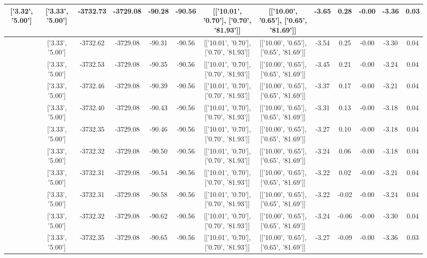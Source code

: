 \begin{table}[htbp]
\begin{adjustbox}{angle=90}
\begin{tabular}{|c|c|c|c|c|c|c|c|c|c|c|c|c|}
 ['3.32', '5.00'] & ['3.33', '5.00'] & -3732.73 & -3729.08 & -90.28 & -90.56 & [['10.01', '0.70'], ['0.70', '81.93']] & [['10.00', '0.65'], ['0.65', '81.69']] & -3.65 & 0.28 & -0.00 & -3.36 & 0.03\\ \hline
 ['3.32', '5.00'] & ['3.33', '5.00'] & -3732.62 & -3729.08 & -90.31 & -90.56 & [['10.01', '0.70'], ['0.70', '81.93']] & [['10.00', '0.65'], ['0.65', '81.69']] & -3.54 & 0.25 & -0.00 & -3.30 & 0.04\\ \hline
 ['3.32', '5.00'] & ['3.33', '5.00'] & -3732.53 & -3729.08 & -90.35 & -90.56 & [['10.01', '0.70'], ['0.70', '81.93']] & [['10.00', '0.65'], ['0.65', '81.69']] & -3.45 & 0.21 & -0.00 & -3.24 & 0.04\\ \hline
 ['3.33', '5.00'] & ['3.33', '5.00'] & -3732.46 & -3729.08 & -90.39 & -90.56 & [['10.01', '0.70'], ['0.70', '81.93']] & [['10.00', '0.65'], ['0.65', '81.69']] & -3.37 & 0.17 & -0.00 & -3.21 & 0.04\\ \hline
 ['3.33', '5.00'] & ['3.33', '5.00'] & -3732.40 & -3729.08 & -90.43 & -90.56 & [['10.01', '0.70'], ['0.70', '81.93']] & [['10.00', '0.65'], ['0.65', '81.69']] & -3.31 & 0.13 & -0.00 & -3.18 & 0.04\\ \hline
 ['3.33', '5.00'] & ['3.33', '5.00'] & -3732.35 & -3729.08 & -90.46 & -90.56 & [['10.01', '0.70'], ['0.70', '81.93']] & [['10.00', '0.65'], ['0.65', '81.69']] & -3.27 & 0.10 & -0.00 & -3.18 & 0.04\\ \hline
 ['3.33', '5.00'] & ['3.33', '5.00'] & -3732.32 & -3729.08 & -90.50 & -90.56 & [['10.01', '0.70'], ['0.70', '81.93']] & [['10.00', '0.65'], ['0.65', '81.69']] & -3.24 & 0.06 & -0.00 & -3.18 & 0.04\\ \hline
 ['3.33', '5.00'] & ['3.33', '5.00'] & -3732.31 & -3729.08 & -90.54 & -90.56 & [['10.01', '0.70'], ['0.70', '81.93']] & [['10.00', '0.65'], ['0.65', '81.69']] & -3.22 & 0.02 & -0.00 & -3.21 & 0.04\\ \hline
 ['3.33', '5.00'] & ['3.33', '5.00'] & -3732.31 & -3729.08 & -90.58 & -90.56 & [['10.01', '0.70'], ['0.70', '81.93']] & [['10.00', '0.65'], ['0.65', '81.69']] & -3.22 & -0.02 & -0.00 & -3.24 & 0.04\\ \hline
 ['3.33', '5.01'] & ['3.33', '5.00'] & -3732.32 & -3729.08 & -90.62 & -90.56 & [['10.01', '0.70'], ['0.70', '81.93']] & [['10.00', '0.65'], ['0.65', '81.69']] & -3.24 & -0.06 & -0.00 & -3.30 & 0.04\\ \hline
 ['3.33', '5.01'] & ['3.33', '5.00'] & -3732.35 & -3729.08 & -90.65 & -90.56 & [['10.01', '0.70'], ['0.70', '81.93']] & [['10.00', '0.65'], ['0.65', '81.69']] & -3.27 & -0.09 & -0.00 & -3.36 & 0.03\\ \hline

\end{tabular}
\end{adjustbox}
\end{table}
